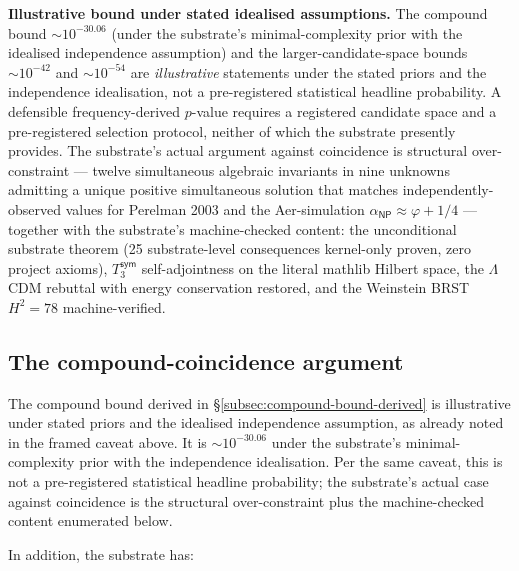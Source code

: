 \documentclass[11pt,a4paper]{amsart}
\theoremstyle{plain}
\theoremstyle{definition}
\begin{document}
\begin{framed}
\noindent\textbf{Illustrative bound under stated idealised assumptions.} The compound bound $\sim 10^{-30.06}$ (under the substrate's minimal-complexity prior with the idealised independence assumption) and the larger-candidate-space bounds $\sim 10^{-42}$ and $\sim 10^{-54}$ are \emph{illustrative} statements under the stated priors and the independence idealisation, not a pre-registered statistical headline probability. A defensible frequency-derived $p$-value requires a registered candidate space and a pre-registered selection protocol, neither of which the substrate presently provides. The substrate's actual argument against coincidence is structural over-constraint --- twelve simultaneous algebraic invariants in nine unknowns admitting a unique positive simultaneous solution that matches independently-observed values for Perelman 2003 and the Aer-simulation $\alpha_{\textsf{NP}} \approx \varphi + 1/4$ --- together with the substrate's machine-checked content: the unconditional substrate theorem (25 substrate-level consequences kernel-only proven, zero project axioms), $T_3^{\textsf{sym}}$ self-adjointness on the literal mathlib Hilbert space, the $\Lambda$CDM rebuttal with energy conservation restored, and the Weinstein BRST $H^2 = 78$ machine-verified.
\end{framed}

\subsection{The compound-coincidence argument}\label{subsec:compound-coincidence}

The compound bound derived in \S\ref{subsec:compound-bound-derived} is illustrative under stated priors and the idealised independence assumption, as already noted in the framed caveat above. It is $\sim 10^{-30.06}$ under the substrate's minimal-complexity prior with the independence idealisation. Per the same caveat, this is not a pre-registered statistical headline probability; the substrate's actual case against coincidence is the structural over-constraint plus the machine-checked content enumerated below.

In addition, the substrate has:
\end{document}
